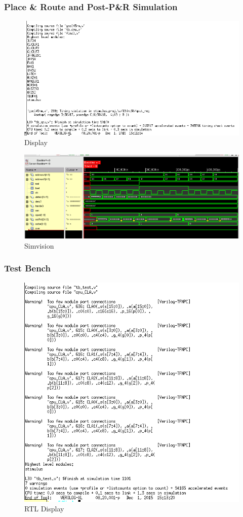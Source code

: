 \documentclass[12pt]{article}
\begin{document}
\subsubsection{Place \& Route and Post-P\&R Simulation}

\begin{figure}[H]
\centering
\includegraphics[width=.7\linewidth]{../CLA/encounter-text}
\caption{Display}
\label{fig:encounter-text}
\end{figure}

\begin{figure}[H]
\centering
\includegraphics[width=\linewidth]{../CLA/encounter-test}
\caption{Simvision}
\label{fig:encounter-test}
\end{figure}

\subsubsection{Test Bench}
\begin{figure}[H]
\centering
\includegraphics[width=.7\linewidth]{../CLA/test-text}
\caption{RTL Display}
\label{fig:test-text}
\end{figure}
\end{document}
